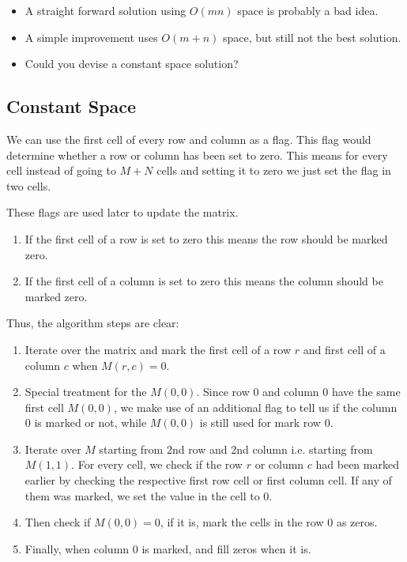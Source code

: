 \begin{itemize}
\item A straight forward solution using $O(mn)$ space is probably a bad idea.
\item A simple improvement uses $O(m + n)$ space, but still not the best solution.
\item Could you devise a constant space solution?
\end{itemize}

\subsection{Constant Space}
We can use the first cell of every row and column as a flag. This flag would determine whether a row or column has been set to zero. This means for every cell instead of going to $M+N$ cells and setting it to zero we just set the flag in two cells.

These flags are used later to update the matrix. 

\begin{enumerate}
\item If the first cell of a row is set to zero this means the row should be marked zero. 

\item If the first cell of a column is set to zero this means the column should be marked zero.
\end{enumerate}

Thus, the algorithm steps are clear:

\begin{enumerate}
\item Iterate over the matrix and mark the first cell of a row $r$ and first cell of a column $c$ when $M(r,c)=0$.
\item Special treatment for the $M(0,0)$. Since row 0 and column 0 have the same first cell $M(0,0)$, we make use of an additional flag to tell us if the column 0 is marked or not, while $M(0,0)$ is still used for mark row 0.
\item Iterate over $M$ starting from 2nd row and 2nd column i.e. starting from $M(1,1)$. For every cell, we check if the row $r$ or column $c$ had been marked earlier by checking the respective first row cell or first column cell. If any of them was marked, we set the value in the cell to 0.
\item Then check if $M(0,0)=0$, if it is, mark the cells in the row 0 as zeros.
\item Finally, when column 0 is marked, and fill zeros when it is.
\end{enumerate}

